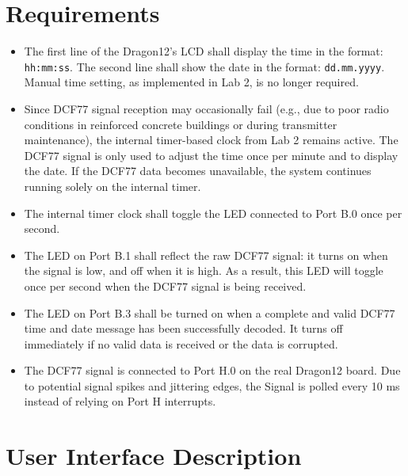 \documentclass[a4paper,12pt]{article}
\begin{document}
\section{Requirements}
\begin{itemize}
    \item The first line of the Dragon12’s LCD shall display the time in the format: \texttt{hh:mm:ss}.  
    The second line shall show the date in the format: \texttt{dd.mm.yyyy}.  
    Manual time setting, as implemented in Lab 2, is no longer required.

    \item Since DCF77 signal reception may occasionally fail (e.g., due to poor radio conditions in reinforced concrete buildings or during transmitter maintenance), the internal timer-based clock from Lab 2 remains active.  
    The DCF77 signal is only used to adjust the time once per minute and to display the date.  
    If the DCF77 data becomes unavailable, the system continues running solely on the internal timer.

    \item The internal timer clock shall toggle the LED connected to Port B.0 once per second.

    \item The LED on Port B.1 shall reflect the raw DCF77 signal:  
    it turns on when the signal is low, and off when it is high.  
    As a result, this LED will toggle once per second when the DCF77 signal is being received.

    \item The LED on Port B.3 shall be turned on when a complete and valid DCF77 time and date message has been successfully decoded.  
    It turns off immediately if no valid data is received or the data is corrupted.

    \item The DCF77 signal is connected to Port H.0 on the real Dragon12 board.  
    Due to potential signal spikes and jittering edges, the Signal is polled every 10 ms instead of relying on Port H interrupts.
\end{itemize}

\newpage


\section{User Interface Description}
\end{document}
